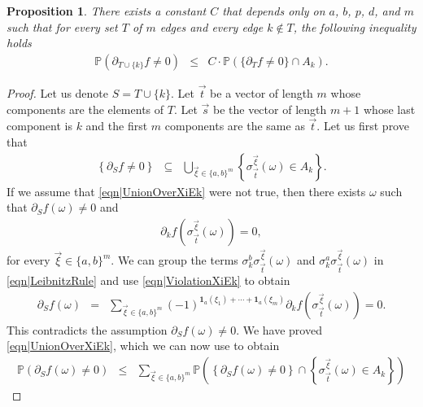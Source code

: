 \documentclass[reqno]{amsart}
\newtheorem{proposition}[theorem]{Proposition}
\begin{document}
\begin{proposition}\label{thm|introducingAAtCost}
There exists a constant $C$ that depends only on $a$, $b$, $p$, $d$, and $m$ such that for every 
 set $T$ of $m$ edges and every edge $k\not \in T$, the following inequality holds
 \begin{eqnarray}
 \mathbb P\left(\partial_{T\cup \{k\}}f\neq 0\right)&\leq& C\cdot \mathbb P\left(\{\partial_Tf\neq 0\}\cap A_k\right). \label{eqn|introducingAAtCost}
 \end{eqnarray}
 \end{proposition}
 \begin{proof} Let us denote $S=T\cup \{k\}$. Let $\overrightarrow t$ be a vector of length $m$ whose components are the elements of $T$. 
 Let $\overrightarrow s$ be the vector of length $m+1$ whose last component is $k$ and the first $m$ components are the same as $\overrightarrow t$. Let us first prove that
\begin{eqnarray}
\left\{\partial_Sf\neq 0\right\}&\subseteq& \bigcup_{\overrightarrow \xi\in \{a,b\}^{m}} \left\{
\sigma^{\overrightarrow \xi}_{\overrightarrow t}(\omega)\in A_k\right\}. \label{eqn|UnionOverXiEk}
\end{eqnarray}
If we assume that \eqref{eqn|UnionOverXiEk}
were not true, then there exists $\omega$ such that $\partial_Sf(\omega)\neq 0$ and  
\begin{eqnarray}\partial_kf\left(\sigma^{\overrightarrow \xi}_{\overrightarrow t}(\omega)\right)=0, \label{eqn|ViolationXiEk}
\end{eqnarray}
for every $\overrightarrow\xi\in\{a,b\}^m$. We can group the terms $\sigma_k^b\sigma^{\overrightarrow \xi}_{\overrightarrow t}(\omega)$ and 
 $\sigma_k^a\sigma^{\overrightarrow \xi}_{\overrightarrow t}(\omega)$ in \eqref{eqn|LeibnitzRule} and use \eqref{eqn|ViolationXiEk} to obtain
\begin{eqnarray}
\partial_Sf(\omega)&=&\sum_{\overrightarrow\xi\in\{a,b\}^m}
(-1)^{\mathbf1_a(\xi_1)+ \cdots+\mathbf1_a(\xi_m)}\partial_kf\left(\sigma^{\overrightarrow \xi}_{\overrightarrow t}(\omega)\right)=0.
\end{eqnarray}
This contradicts the assumption $\partial_Sf(\omega) \neq 0$. We have proved \eqref{eqn|UnionOverXiEk}, which we can now use to obtain
\begin{eqnarray}
\mathbb P\left(\partial_Sf(\omega)\neq 0\right)&\leq& \sum_{\overrightarrow\xi\in\{a,b\}^m}
\mathbb P\left(\left\{\partial_Sf(\omega)\neq 0\right\}\cap \left\{
\sigma^{\overrightarrow \xi}_{\overrightarrow t}(\omega)\in A_k\right\}\right)

\end{eqnarray}
\end{proof}
\end{document}
